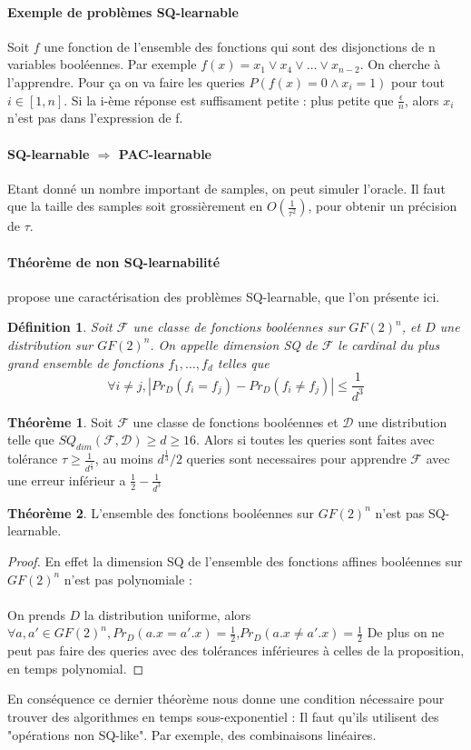 \documentclass{article}		%
\newtheorem{defi}{Définition}
\theoremstyle{definition}
\newtheorem{theo}{Théorème}
\theoremstyle{plain}
\begin{document}
\paragraph{Exemple de problèmes SQ-learnable}
Soit $f$ une fonction de l'ensemble des fonctions qui sont des
disjonctions de n variables booléennes. Par exemple
$f(x)=x_1 \vee x_4 \vee \dots \vee x_{n-2}$.
On cherche à l'apprendre. Pour ça on va faire les queries
$P(f(x)=0\wedge x_i=1)$ pour tout $i\in [1,n]$. Si la i-ème réponse est
suffisament petite : plus petite que $\frac{\epsilon}{n}$, alors $x_i$
n'est pas dans l'expression de f.  
\paragraph{SQ-learnable $\Rightarrow$ PAC-learnable}
Etant donné un nombre important de samples, on peut simuler l'oracle. Il
faut que la taille des samples soit grossièrement en
$O(\frac{1}{\tau^2})$, pour obtenir un précision de $\tau$.
  
\paragraph{Théorème de non SQ-learnabilité}
\cite{Blum} propose une caractérisation des problèmes SQ-learnable, que
l'on présente ici.
\begin{defi}
Soit $\mathcal{F}$ une classe de fonctions booléennes sur $GF(2)^n$, et $D$ une
distribution sur $GF(2)^n$.
On appelle dimension SQ de $\mathcal{F}$ le cardinal
du plus grand ensemble de fonctions $f_1,\dots, f_d$ telles que 
$$\forall i \not= j, |Pr_D(f_i=f_j)-Pr_D(f_i \not= f_j)|\leq \frac{1}{d^3} $$
\end{defi}
\begin{theo}
Soit $\mathcal{F}$ une classe de fonctions booléennes et $\mathcal{D}$
une distribution telle que $SQ_{dim}(\mathcal{F},\mathcal{D})\geq d \geq
16$. Alors si toutes les queries sont faites avec tolérance
$\tau\geq\frac{1}{d^{\frac{1}{3}}}$, au moins $d^{\frac{1}{3}}/2$ queries
sont necessaires pour apprendre $\mathcal{F}$ avec une erreur inférieur a
$\frac{1}{2}-\frac{1}{d^3}$ 
\end{theo}
\begin{theo}
L'ensemble des fonctions booléennes sur $GF(2)^n$ n'est pas
SQ-learnable.
\end{theo}
\begin{proof}
En effet la dimension SQ de l'ensemble des fonctions affines booléennes sur
$GF(2)^n$ n'est pas polynomiale :
\\\\
On prends $D$ la distribution uniforme, alors 
$\forall a,a'\in GF(2)^n,
Pr_D(a.x=a'.x)=\frac{1}{2}$,$Pr_D(a.x\not=a'.x)=\frac{1}{2}$
 De plus on ne peut pas faire des queries avec
des tolérances inférieures à celles de la proposition, en temps
polynomial.
\end{proof}
En conséquence ce dernier théorème nous donne une condition nécessaire
pour trouver des algorithmes en temps sous-exponentiel : Il faut qu'ils
utilisent des "opérations non SQ-like". Par exemple, des combinaisons
linéaires.
\end{document}
